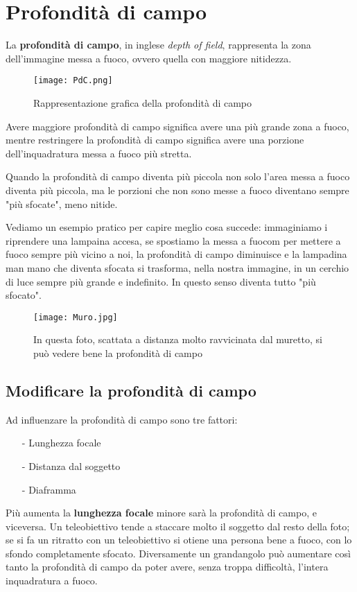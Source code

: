 \section{Profondità di campo} \label{sec:dof}
La \textbf{profondità di campo}, in inglese \textit{depth of field}, rappresenta la zona dell'immagine messa a fuoco, ovvero quella con maggiore nitidezza.

\begin{figure}[h]
    \centering
    \texttt{[image: PdC.png]}
    \caption{Rappresentazione grafica della profondità di campo}
\end{figure}

Avere maggiore profondità di campo significa avere una più grande zona a fuoco, mentre restringere la profondità di campo significa avere una porzione dell'inquadratura messa a fuoco più stretta.

Quando la profondità di campo diventa più piccola non solo l'area messa a fuoco diventa più piccola, ma le porzioni che non sono messe a fuoco diventano sempre "più sfocate", meno nitide.

Vediamo un esempio pratico per capire meglio cosa succede: immaginiamo i riprendere una lampaina accesa, se spostiamo la messa a fuocom per mettere a fuoco sempre più vicino a noi, la profondità di campo diminuisce e la lampadina man mano che diventa sfocata si trasforma, nella nostra immagine, in un cerchio di luce sempre più grande e indefinito. In questo senso diventa tutto "più sfocato".

\begin{figure}[h]
    \texttt{[image: Muro.jpg]}
    \caption{
        In questa foto, scattata a distanza molto ravvicinata dal muretto, si può vedere bene la profondità di campo
    }
\end{figure}

\subsection{Modificare la profondità di campo} \label{subsec:modificadof}
Ad influenzare la profondità di campo sono tre fattori:
\begin{itemize}
    \item[-] Lunghezza focale
    \item[-] Distanza dal soggetto
    \item[-] Diaframma
\end{itemize}

Più aumenta la \textbf{lunghezza focale} minore sarà la profondità di campo, e viceversa.\newline
Un teleobiettivo tende a staccare molto il soggetto dal resto della foto; se si fa un ritratto con un teleobiettivo si otiene una persona bene a fuoco, con lo sfondo completamente sfocato.
Diversamente un grandangolo può aumentare così tanto la profondità di campo da poter avere, senza troppa difficoltà, l'intera inquadratura a fuoco.

